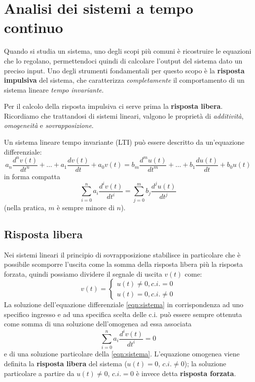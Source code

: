 \documentclass[a4paper, titlepage, oneside]{scrbook}
\begin{document}
\chapter{Analisi dei sistemi a tempo continuo}
Quando si studia un sistema, uno degli scopi più comuni è ricostruire le equazioni che lo regolano, permettendoci quindi di calcolare l'output del sistema dato un preciso input.
Uno degli strumenti fondamentali per questo scopo è la \textbf{risposta impulsiva} del sistema, che caratterizza \textit{completamente} il comportamento di un sistema lineare \textit{tempo invariante}.

Per il calcolo della risposta impulsiva ci serve prima la \textbf{risposta libera}.
Ricordiamo che trattandosi di sistemi lineari, valgono le proprietà di \textit{additività}, \textit{omogeneità} e \textit{sovrapposizione}.

Un sistema lineare tempo invariante (LTI) può essere descritto da un'equazione differenziale:
\begin{equation*}
	a_n\frac{d^nv(t)}{dt^n} + \ldots + a_1\frac{dv(t)}{dt} + a_0v(t) = b_m\frac{d^mu(t)}{dt^m} + \ldots + b_1\frac{du(t)}{dt} + b_0u(t)
\end{equation*}
in forma compatta
\begin{equation}
	\sum_{i=0}^{n}a_i\frac{d^iv(t)}{dt^i} = \sum_{j=0}^{m}b_j\frac{d^ju(t)}{dt^j}
	\label{eqn:sistema}
\end{equation}
(nella pratica, $m$ è sempre minore di $n$).

\section{Risposta libera}
Nei sistemi lineari il principio di sovrapposizione stabilisce in particolare che è possibile scomporre l'uscita come la somma della risposta libera più la risposta forzata, quindi possiamo dividere il segnale di uscita $v(t)$ come:
\begin{equation*}
	v(t)=
		\begin{cases}
		u(t) \ne 0, c.i. = 0\\
		u(t) = 0, c.i. \ne 0
		\end{cases}
\end{equation*}
La soluzione dell'equazione differenziale \ref{eqn:sistema} in corrispondenza ad uno specifico ingresso e ad una specifica scelta delle c.i. può essere sempre ottenuta come somma di una soluzione dell'omogenea ad essa associata
\begin{equation}
	\sum_{i=0}^{n}a_i\frac{d^iv(t)}{dt^i}=0
	\label{eqn:omogenea_associata}
\end{equation}
e di una soluzione particolare della \ref{eqn:sistema}.
L'equazione omogenea viene definita la \textbf{risposta libera} del sistema ($u(t)=0$, $c.i.\ne 0$); la soluzione particolare a partire da $u(t)\ne 0$, $c.i.=0$ è invece detta \textbf{risposta forzata}.
\end{document}
